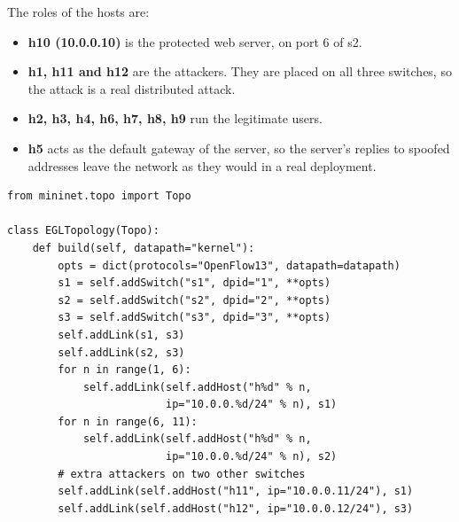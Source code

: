 \documentclass[12pt,a4paper]{article}
\begin{document}
The roles of the hosts are:
\begin{itemize}
  \item \textbf{h10 (10.0.0.10)} is the protected web server, on port 6 of s2.
  \item \textbf{h1, h11 and h12} are the attackers. They are placed on all three
  switches, so the attack is a real distributed attack.
  \item \textbf{h2, h3, h4, h6, h7, h8, h9} run the legitimate users.
  \item \textbf{h5} acts as the default gateway of the server, so the server's
  replies to spoofed addresses leave the network as they would in a real
  deployment.
\end{itemize}

\begin{lstlisting}[caption={Mininet Topology for the Experiments}]
from mininet.topo import Topo

class EGLTopology(Topo):
    def build(self, datapath="kernel"):
        opts = dict(protocols="OpenFlow13", datapath=datapath)
        s1 = self.addSwitch("s1", dpid="1", **opts)
        s2 = self.addSwitch("s2", dpid="2", **opts)
        s3 = self.addSwitch("s3", dpid="3", **opts)
        self.addLink(s1, s3)
        self.addLink(s2, s3)
        for n in range(1, 6):
            self.addLink(self.addHost("h%d" % n,
                         ip="10.0.0.%d/24" % n), s1)
        for n in range(6, 11):
            self.addLink(self.addHost("h%d" % n,
                         ip="10.0.0.%d/24" % n), s2)
        # extra attackers on two other switches
        self.addLink(self.addHost("h11", ip="10.0.0.11/24"), s1)
        self.addLink(self.addHost("h12", ip="10.0.0.12/24"), s3)
\end{lstlisting}
\end{document}
